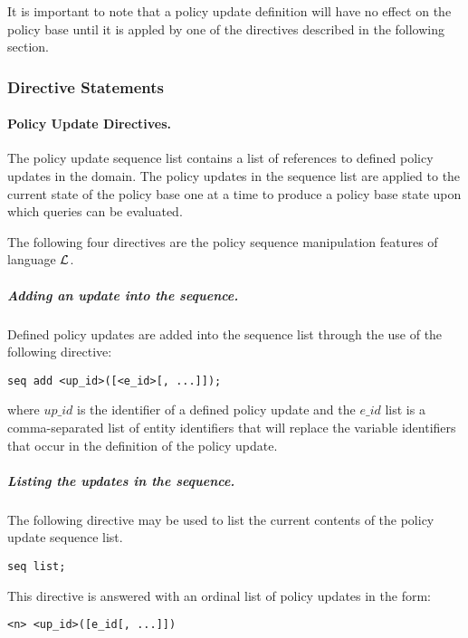 \documentclass[10pt, twocolumn]{article}
\begin{document}
          It is important to note that a policy update definition will have no
          effect on the policy base until it is appled by one of the directives
          described in the following section.

        \subsubsection{Directive Statements}

        \paragraph{Policy Update Directives.}

        The policy update sequence list contains a list of references to
        defined policy updates in the domain. The policy updates in the
        sequence list are applied to the current state of the policy base one
        at a time to produce a policy base state upon which queries can be
        evaluated.

        The following four directives are the policy sequence manipulation
        features of language $\cal{L}$.

        \subparagraph{Adding an update into the sequence.}
          Defined policy updates are added into the sequence list through the
          use of the following directive:

          \begin{verbatim}seq add <up_id>([<e_id>[, ...]]);\end{verbatim}

          \noindent where $up\_id$ is the identifier of a defined policy
          update and the $e\_id$ list is a comma-separated list of entity
          identifiers that will replace the variable identifiers that occur in
          the definition of the policy update.

        \subparagraph{Listing the updates in the sequence.}
          The following directive may be used to list the current contents of
          the policy update sequence list.

          \begin{verbatim}seq list;\end{verbatim}

          This directive is answered with an ordinal list of policy updates in
          the form:

          \begin{verbatim}<n> <up_id>([e_id[, ...]])\end{verbatim}
\end{document}
